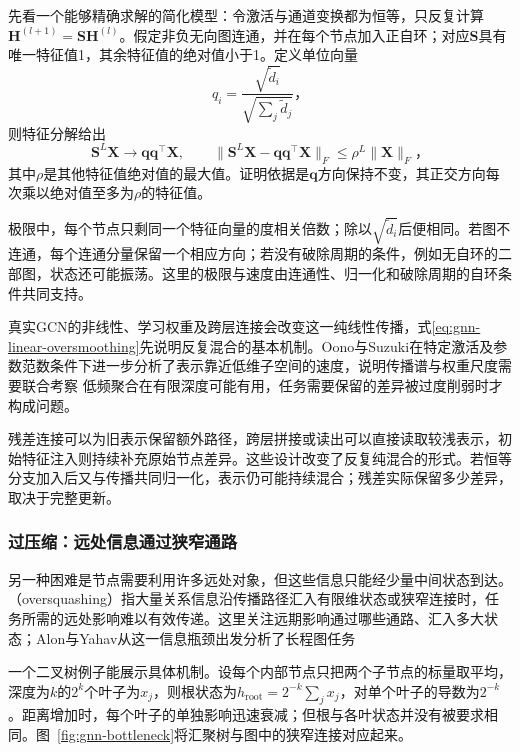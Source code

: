 先看一个能够精确求解的简化模型：令激活与通道变换都为恒等，只反复计算$\bm{H}^{(l+1)}=\bm{S}\bm{H}^{(l)}$。假定非负无向图连通，并在每个节点加入正自环；对应$\bm{S}$具有唯一特征值1，其余特征值的绝对值小于1。定义单位向量
\[
  q_i=\frac{\sqrt{\widetilde d_i}}{\sqrt{\sum_j\widetilde d_j}}\text{，}
\]
则特征分解给出
\begin{equation}
  \bm{S}^L\bm{X}\longrightarrow\bm{q}\bm{q}^{\top}\bm{X},\qquad
  \lVert\bm{S}^L\bm{X}-\bm{q}\bm{q}^{\top}\bm{X}\rVert_F
    \leq\rho^L\lVert\bm{X}\rVert_F\text{，}
  \label{eq:gnn-linear-oversmoothing}
\end{equation}
其中$\rho$是其他特征值绝对值的最大值。证明依据是$\bm{q}$方向保持不变，其正交方向每次乘以绝对值至多为$\rho$的特征值。

极限中，每个节点只剩同一个特征向量的度相关倍数；除以$\sqrt{\widetilde d_i}$后便相同。若图不连通，每个连通分量保留一个相应方向；若没有破除周期的条件，例如无自环的二部图，状态还可能振荡。这里的极限与速度由连通性、归一化和破除周期的自环条件共同支持。

真实GCN的非线性、学习权重及跨层连接会改变这一纯线性传播，式\eqref{eq:gnn-linear-oversmoothing}先说明反复混合的基本机制。Oono与Suzuki在特定激活及参数范数条件下进一步分析了表示靠近低维子空间的速度，说明传播谱与权重尺度需要联合考察 低频聚合在有限深度可能有用，任务需要保留的差异被过度削弱时才构成问题。

残差连接可以为旧表示保留额外路径，跨层拼接或读出可以直接读取较浅表示，初始特征注入则持续补充原始节点差异。这些设计改变了反复纯混合的形式。若恒等分支加入后又与传播共同归一化，表示仍可能持续混合；残差实际保留多少差异，取决于完整更新。

\subsubsection{过压缩：远处信息通过狭窄通路}
\label{sec:gnn-oversquashing}

另一种困难是节点需要利用许多远处对象，但这些信息只能经少量中间状态到达。（oversquashing）指大量关系信息沿传播路径汇入有限维状态或狭窄连接时，任务所需的远处影响难以有效传递。这里关注远期影响通过哪些通路、汇入多大状态；Alon与Yahav从这一信息瓶颈出发分析了长程图任务

一个二叉树例子能展示具体机制。设每个内部节点只把两个子节点的标量取平均，深度为$k$的$2^k$个叶子为$x_j$，则根状态为$h_{\mathrm{root}}=2^{-k}\sum_jx_j$，对单个叶子的导数为$2^{-k}$。距离增加时，每个叶子的单独影响迅速衰减；但根与各叶状态并没有被要求相同。图~\ref{fig:gnn-bottleneck}将汇聚树与图中的狭窄连接对应起来。

